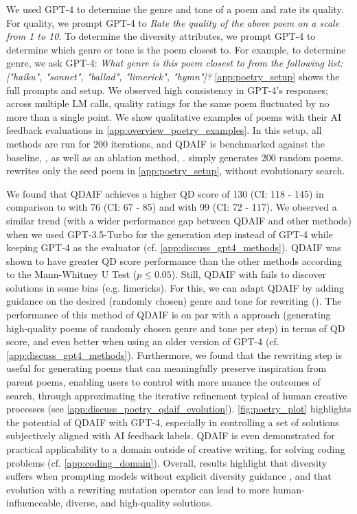 We used GPT-4 to determine the genre and tone of a poem and rate its quality. For quality, we prompt GPT-4 to \textit{Rate the quality of the above poem on a scale from 1 to 10}. To determine the diversity attributes, we prompt GPT-4 to determine which genre or tone is the poem closest to. For example, to determine genre, we ask GPT-4: \textit{What genre is this poem closest to from the following list: ["haiku", "sonnet", "ballad", "limerick", "hymn"]?} \cref{app:poetry_setup} shows the full prompts and setup. We observed high consistency in GPT-4's responses; across multiple LM calls, quality ratings for the same poem fluctuated by no more than a single point. We show qualitative examples of poems with their AI feedback evaluations in \cref{app:overview_poetry_examples}. In this setup, all methods are run for 200 iterations, and QDAIF is benchmarked against the baseline, \poembaseone, as well as an ablation method, \poemablation. \poembaseone{} simply generates 200 random poems. \poemablation{} rewrites only the seed poem in \cref{app:poetry_setup}, without evolutionary search.

We found that QDAIF achieves a higher QD score of 130 (CI: 118 - 145) in comparison to \poembaseone{} with 76 (CI: 67 - 85) and \poemablation{} with 99 (CI: 72 - 117). We observed a similar trend (with a wider performance gap between QDAIF and other methods) when we used GPT-3.5-Turbo for the generation step instead of GPT-4 while keeping GPT-4 as the evaluator (cf. \cref{app:discuss_gpt4_methods}). QDAIF was shown to have greater QD score performance than the other methods according to the Mann-Whitney U Test ($p \leq 0.05$). Still, QDAIF with \textbf{\qdaifrewrite} fails to discover solutions in some bins (e.g. limericks). For this, we can adapt QDAIF by adding guidance on the desired (randomly chosen) genre and tone for rewriting (\textbf{\qdaifguided}). The performance of this method of QDAIF is on par with a \poembasetwo{} approach (generating high-quality poems of randomly chosen genre and tone per step) in terms of QD score, and even better when using an older version of GPT-4 (cf. \cref{app:discuss_gpt4_methods}). Furthermore, we found that the rewriting step is useful for generating poems that can meaningfully preserve inspiration from parent poems, enabling users to control with more nuance the outcomes of search, through approximating the iterative refinement typical of human creative processes \citep{stanley2017open} (see \cref{app:discuss_poetry_qdaif_evolution}). \cref{fig:poetry_plot} highlights the potential of QDAIF with GPT-4, especially in controlling a set of solutions subjectively aligned with AI feedback labels. QDAIF is even demonstrated for practical applicability to a domain outside of creative writing, for solving coding problems (cf. \cref{app:coding_domain}). Overall, results highlight that diversity suffers when prompting models without explicit diversity guidance \citep{llm_sampling_renda_hopkins_2023,friedrich2023fair,kirk2023understanding}, and that evolution with a rewriting mutation operator can lead to more human-influenceable, diverse, and high-quality solutions.